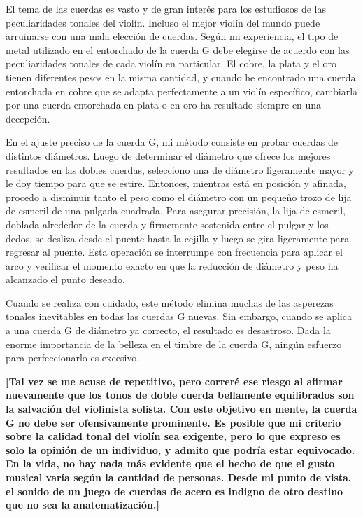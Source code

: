 \documentclass[12pt]{book}
\begin{document}
El tema de las cuerdas es vasto y de gran interés para los estudiosos de las peculiaridades tonales del violín. Incluso el mejor violín del mundo puede arruinarse con una mala elección de cuerdas. Según mi experiencia, el tipo de metal utilizado en el entorchado de la cuerda G debe elegirse de acuerdo con las peculiaridades tonales de cada violín en particular. El cobre, la plata y el oro tienen diferentes pesos en la misma cantidad, y cuando he encontrado una cuerda entorchada en cobre que se adapta perfectamente a un violín específico, cambiarla por una cuerda entorchada en plata o en oro ha resultado siempre en una decepción. 

En el ajuste preciso de la cuerda G, mi método consiste en probar cuerdas de distintos diámetros. Luego de determinar el diámetro que ofrece los mejores resultados en las dobles cuerdas, selecciono una de diámetro ligeramente mayor y le doy tiempo para que se estire. Entonces, mientras está en posición y afinada, procedo a disminuir tanto el peso como el diámetro con un pequeño trozo de lija de esmeril de una pulgada cuadrada. Para asegurar precisión, la lija de esmeril, doblada alrededor de la cuerda y firmemente sostenida entre el pulgar y los dedos, se desliza desde el puente hasta la cejilla y luego se gira ligeramente para regresar al puente. Esta operación se interrumpe con frecuencia para aplicar el arco y verificar el momento exacto en que la reducción de diámetro y peso ha alcanzado el punto deseado. 

Cuando se realiza con cuidado, este método elimina muchas de las asperezas tonales inevitables en todas las cuerdas G nuevas. Sin embargo, cuando se aplica a una cuerda G de diámetro ya correcto, el resultado es desastroso. Dada la enorme importancia de la belleza en el timbre de la cuerda G, ningún esfuerzo para perfeccionarlo es excesivo.

\textbf{[Tal vez se me acuse de repetitivo, pero correré ese riesgo al afirmar nuevamente que los tonos de doble cuerda bellamente equilibrados son la salvación del violinista solista. Con este objetivo en mente, la cuerda G no debe ser ofensivamente prominente. Es posible que mi criterio sobre la calidad tonal del violín sea exigente, pero lo que expreso es solo la opinión de un individuo, y admito que podría estar equivocado. En la vida, no hay nada más evidente que el hecho de que el gusto musical varía según la cantidad de personas. Desde mi punto de vista, el sonido de un juego de cuerdas de acero es indigno de otro destino que no sea la anatematización.]}
\end{document}
